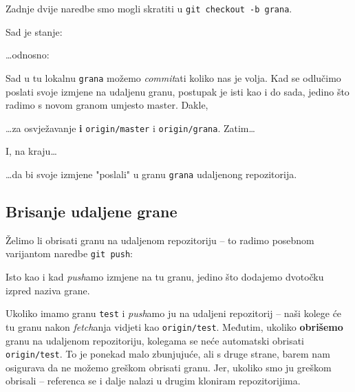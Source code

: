 
Zadnje dvije naredbe smo mogli skratiti u \verb+git checkout -b grana+.

Sad je stanje:



\dots{}odnosno:



Sad u tu lokalnu \verb+grana+ možemo \emph{commit}ati koliko nas je volja.
Kad se odlučimo poslati svoje izmjene na udaljenu granu, postupak je isti kao i do sada, jedino što radimo s novom granom umjesto master.
Dakle,


\dots{}za osvježavanje \textbf{i} \verb+origin/master+ i \verb+origin/grana+.
Zatim\dots


I, na kraju\dots


\dots{}da bi svoje izmjene "poslali" u granu \verb+grana+ udaljenong repozitorija.

\subsection*{Brisanje udaljene grane}

Želimo li obrisati granu na udaljenom repozitoriju -- to radimo posebnom varijantom naredbe \verb+git push+:


Isto kao i kad \emph{push}amo izmjene na tu granu, jedino što dodajemo dvotočku izpred naziva grane.

Ukoliko imamo granu \verb+test+ i \emph{push}amo ju na udaljeni repozitorij -- naši kolege će tu granu nakon \emph{fetch}anja vidjeti kao \verb+origin/test+.
Međutim, ukoliko \textbf{obrišemo} granu na udaljenom repozitoriju, kolegama se neće automatski obrisati \verb+origin/test+.
To je ponekad malo zbunjujuće, ali s druge strane, barem nam osigurava da ne možemo greškom obrisati granu.
Jer, ukoliko smo ju greškom obrisali -- referenca se i dalje nalazi u drugim kloniram repozitorijima.

